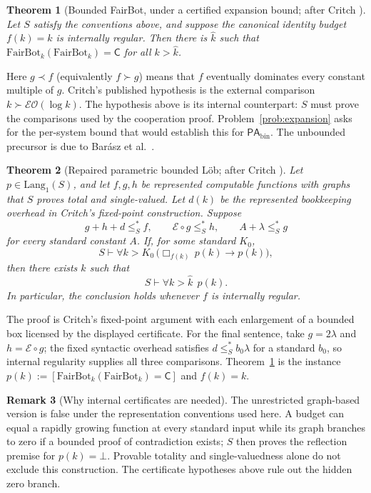 \documentclass[11pt]{amsart}
\theoremstyle{plain}
\newtheorem{theorem}{Theorem}[section]
\theoremstyle{definition}
\newtheorem{remark}[theorem]{Remark}
\newcommand{\PAbin}{\mathsf{PA}_{\mathrm{bin}}}
\newcommand{\Lang}{\mathrm{Lang}}
\newcommand{\FB}{\mathrm{FairBot}}
\newcommand{\leSstar}{\mathrel{\leq_S^{*}}}
\begin{document}
\begin{theorem}[Bounded FairBot, under a certified expansion bound; after Critch \cite{critch2016}]
\label{thm:fairbot}
Let $S$ satisfy the conventions above, and suppose the canonical identity budget $f(k)=k$ is internally regular. Then there is $\hat{k}$ such that $\FB_k(\FB_k) = \mathsf{C}$ for all $k > \hat{k}$.
\end{theorem}

Here $g \prec f$ (equivalently $f \succ g$) means that $f$ eventually dominates every constant multiple of $g$. Critch's published hypothesis is the external comparison $k\succ\mathcal{E}\mathcal{O}(\log k)$. The hypothesis above is its internal counterpart: $S$ must prove the comparisons used by the cooperation proof. Problem~\ref{prob:expansion} asks for the per-system bound that would establish this for $\PAbin$. The unbounded precursor is due to Bar\'asz et al.\ \cite{barasz2014}.

\begin{theorem}[Repaired parametric bounded L\"ob; after Critch \cite{critch2016}]
\label{thm:pbl}
Let $p \in \Lang_1(S)$, and let $f,g,h$ be represented computable functions with graphs that $S$ proves total and single-valued. Let $d(k)$ be the represented bookkeeping overhead in Critch's fixed-point construction. Suppose
\[
g+h+d\leSstar f,\qquad \mathcal{E}\circ g\leSstar h,
\qquad A+\lambda\leSstar g
\]
for every standard constant $A$. If, for some standard $K_0$,
\[
S \vdash \forall k>K_0\,\bigl(\Box_{f(k)}\, p(k) \to p(k)\bigr),
\]
then there exists $\hat{k}$ such that
\[
S \vdash \forall k > \hat{k}\;\, p(k).
\]
In particular, the conclusion holds whenever $f$ is internally regular.
\end{theorem}

The proof is Critch's fixed-point argument with each enlargement of a bounded box licensed by the displayed certificate. For the final sentence, take $g=2\lambda$ and $h=\mathcal{E}\circ g$; the fixed syntactic overhead satisfies $d\leSstar b_0\lambda$ for a standard $b_0$, so internal regularity supplies all three comparisons. Theorem~\ref{thm:fairbot} is the instance $p(k):=[\FB_k(\FB_k)=\mathsf C]$ and $f(k)=k$.

\begin{remark}[Why internal certificates are needed]
\label{rem:pbl-audit}
The unrestricted graph-based version is false under the representation conventions used here. A budget can equal a rapidly growing function at every standard input while its graph branches to zero if a bounded proof of contradiction exists; $S$ then proves the reflection premise for $p(k)=\bot$. Provable totality and single-valuedness alone do not exclude this construction. The certificate hypotheses above rule out the hidden zero branch.
\end{remark}
\end{document}
